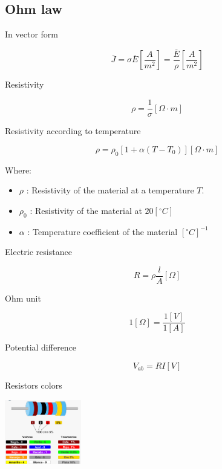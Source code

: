 \documentclass[letterpaper]{article}
\newcommand{\divline}{\noindent\makebox[\linewidth]{\rule{\textwidth}{0.4pt}}}
\begin{document}
    \begin{multicols}{2}
        \section{Ohm law}

        In vector form

        \[\overline{J} = \sigma \overline{E} \left[ \frac{A}{m^{2}} \right] = \frac{\overline{E}}{\rho} \left[ \frac{A}{m^{2}} \right] \] 

        Resistivity

        \[\rho = \frac{1}{\sigma} \left[ \Omega \cdot m \right] \]

        Resistivity according to temperature

        \[\rho = \rho_{0} \left[ 1 + \alpha (T - T_{0}) \right] \left[ \Omega \cdot m \right] \]

        Where:

        \begin{itemize}
            \item \(\rho\) : Resistivity of the material at a temperature \(T\).
            \item \(\rho_{0}\) : Resistivity of the material at \(20  \left[ ^\circ C \right] \)
            \item \(\alpha\) : Temperature coefficient of the material \(\left[ ^\circ C \right]^{-1} \)
        \end{itemize}

        Electric resistance

        \[R = \rho \frac{l}{A} \left[\Omega\right]\]

        Ohm unit

        \[1 \left[\Omega\right] = \frac{1[V]}{1[A]}\]

        Potential difference

        \[V_{ab} = R I \left[ V\right] \]

        Resistors colors

        \begin{center}
            \includegraphics[width=0.25\textwidth]{ElectricidadyMagnetismo/img/resistance_colors.png}
        \end{center}
    \end{multicols}
    \divline
\end{document}
